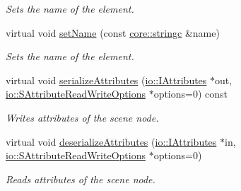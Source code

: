 \begin{DoxyCompactItemize}
\begin{DoxyCompactList}\small\item\em Sets the name of the element. \end{DoxyCompactList}\item 
virtual void \hyperlink{classirr_1_1gui_1_1IGUIElement_a5e318b47fece6d4157a1d7ccf401f1c8}{set\+Name} (const \hyperlink{namespaceirr_1_1core_ab26a0e0359206b5a694f35c37c829d7f}{core\+::stringc} \&name)
\begin{DoxyCompactList}\small\item\em Sets the name of the element. \end{DoxyCompactList}\item 
virtual void \hyperlink{classirr_1_1gui_1_1IGUIElement_ac575f2f817b05733dbc667ff298f6e78}{serialize\+Attributes} (\hyperlink{classirr_1_1io_1_1IAttributes}{io\+::\+I\+Attributes} $\ast$out, \hyperlink{structirr_1_1io_1_1SAttributeReadWriteOptions}{io\+::\+S\+Attribute\+Read\+Write\+Options} $\ast$options=0) const
\begin{DoxyCompactList}\small\item\em Writes attributes of the scene node. \end{DoxyCompactList}\item 
virtual void \hyperlink{classirr_1_1gui_1_1IGUIElement_af71b96163b8d95816cd9c80fbf413b4d}{deserialize\+Attributes} (\hyperlink{classirr_1_1io_1_1IAttributes}{io\+::\+I\+Attributes} $\ast$in, \hyperlink{structirr_1_1io_1_1SAttributeReadWriteOptions}{io\+::\+S\+Attribute\+Read\+Write\+Options} $\ast$options=0)
\begin{DoxyCompactList}\small\item\em Reads attributes of the scene node. \end{DoxyCompactList}\end{DoxyCompactItemize}
